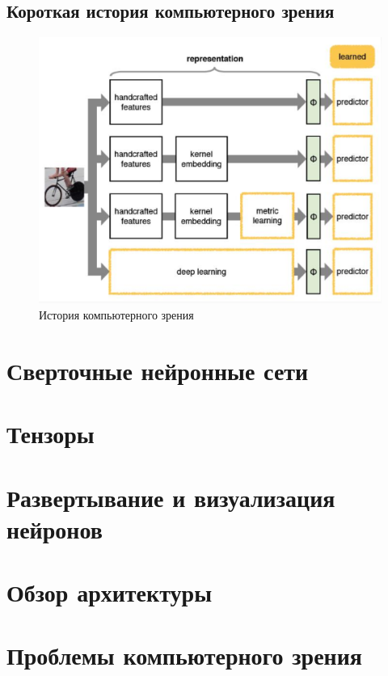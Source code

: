 \documentclass[10pt,a4paper,oneside,titlepage]{report}
\theoremstyle{defenition}
\theoremstyle{theorem}
\begin{document}
\subsection{Короткая история компьютерного зрения}

\begin{figure}[h!]
	\centering
	\includegraphics[width=0.4\linewidth]{pictures/ComputerVision}
	\caption{История компьютерного зрения}
	\label{fig:computervision}
\end{figure}


\section{Сверточные нейронные сети}

\section{Тензоры}

\section{Развертывание и визуализация нейронов}

\section{Обзор архитектуры}

\section{Проблемы компьютерного зрения}
\end{document}
